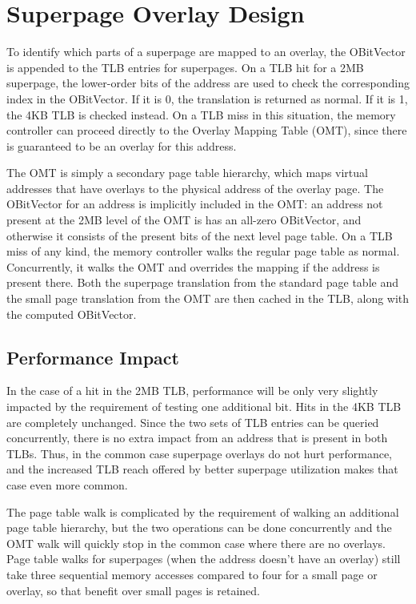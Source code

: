\chapter{Superpage Overlay Design}

To identify which parts of a superpage are mapped to an overlay, the OBitVector is appended to the TLB entries for superpages. On a TLB hit for a 2MB superpage, the lower-order bits of the address are used to check the corresponding index in the OBitVector. If it is 0, the translation is returned as normal. If it is 1, the 4KB TLB is checked instead. On a TLB miss in this situation, the memory controller can proceed directly to the Overlay Mapping Table (OMT), since there is guaranteed to be an overlay for this address.

The OMT is simply a secondary page table hierarchy, which maps virtual addresses that have overlays to the physical address of the overlay page. The OBitVector for an address is implicitly included in the OMT: an address not present at the 2MB level of the OMT is has an all-zero OBitVector, and otherwise it consists of the present bits of the next level page table. On a TLB miss of any kind, the memory controller walks the regular page table as normal. Concurrently, it walks the OMT and overrides the mapping if the address is present there. Both the superpage translation from the standard page table and the small page translation from the OMT are then cached in the TLB, along with the computed OBitVector.

\section{Performance Impact}
In the case of a hit in the 2MB TLB, performance will be only very slightly impacted by the requirement of testing one additional bit. Hits in the 4KB TLB are completely unchanged. Since the two sets of TLB entries can be queried concurrently, there is no extra impact from an address that is present in both TLBs. Thus, in the common case superpage overlays do not hurt performance, and the increased TLB reach offered by better superpage utilization makes that case even more common.

The page table walk is complicated by the requirement of walking an additional page table hierarchy, but the two operations can be done concurrently and the OMT walk will quickly stop in the common case where there are no overlays. Page table walks for superpages (when the address doesn't have an overlay) still take three sequential memory accesses compared to four for a small page or overlay, so that benefit over small pages is retained.

